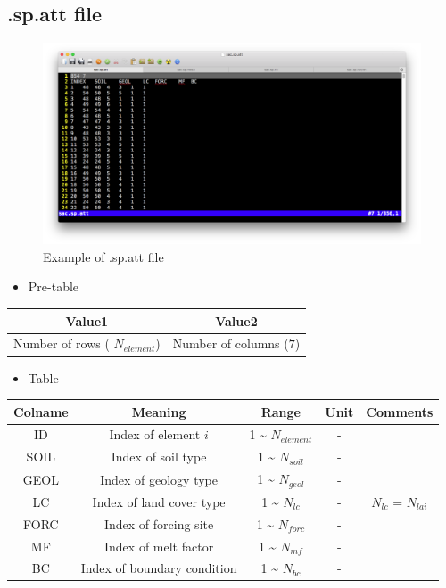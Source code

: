 \documentclass[]{scrbook}
\providecommand{\tightlist}{%
  \setlength{\itemsep}{0pt}\setlength{\parskip}{0pt}}
\begin{document}
\subsection{.sp.att file}\label{sp.att-file}

\begin{figure}
\centering
\includegraphics{Fig/IO/sp.att.png}
\caption{Example of .sp.att file}
\end{figure}

\begin{itemize}
\tightlist
\item
  Pre-table
\end{itemize}

\begin{longtable}[]{@{}cc@{}}
\toprule
Value1 & Value2\tabularnewline
\midrule
\endhead
Number of rows ( \(N_{element}\)) & Number of columns
(\(7\))\tabularnewline
\bottomrule
\end{longtable}

\begin{itemize}
\tightlist
\item
  Table
\end{itemize}

\begin{longtable}[]{@{}ccccc@{}}
\toprule
Colname & Meaning & Range & Unit & Comments\tabularnewline
\midrule
\endhead
ID & Index of element \(i\) & 1 \textasciitilde{} \(N_{element}\) & -
&\tabularnewline
SOIL & Index of soil type & 1 \textasciitilde{} \(N_{soil}\) & -
&\tabularnewline
GEOL & Index of geology type & 1 \textasciitilde{} \(N_{geol}\) & -
&\tabularnewline
LC & Index of land cover type & 1 \textasciitilde{} \(N_{lc}\) & - &
\(N_{lc}\) = \(N_{lai}\)\tabularnewline
FORC & Index of forcing site & 1 \textasciitilde{} \(N_{forc}\) & -
&\tabularnewline
MF & Index of melt factor & 1 \textasciitilde{} \(N_{mf}\) & -
&\tabularnewline
BC & Index of boundary condition & 1 \textasciitilde{} \(N_{bc}\) & -
&\tabularnewline
\bottomrule
\end{longtable}
\end{document}
